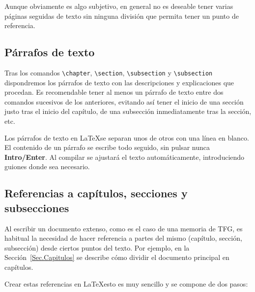 Aunque obviamente es algo subjetivo, en general no es deseable tener varias páginas seguidas de texto sin ninguna división que permita tener un punto de referencia.

\subsection{Párrafos de texto}

Tras los comandos \verb|\chapter|, \verb|\section|, \verb|\subsection| y \verb|\subsection| dispondremos los párrafos de texto con las descripciones y explicaciones que procedan. Es recomendable tener al menos un párrafo de texto entre dos comandos sucesivos de los anteriores, evitando así tener el inicio de una sección justo tras el inicio del capítulo, de una subsección inmediatamente tras la sección, etc.

Los párrafos de texto en \LaTeX se separan unos de otros con una línea en blanco. El contenido de un párrafo se escribe todo seguido, sin pulsar nunca \textbf{Intro/Enter}. Al compilar se ajustará el texto automáticamente, introduciendo guiones donde sea necesario.

\subsection{Referencias a capítulos, secciones y subsecciones}\label{Sec.Referencias}

Al escribir un documento extenso, como es el caso de una memoria de TFG, es habitual la necesidad de hacer referencia a partes del mismo (capítulo, sección, subsección) desde ciertos puntos del texto. Por ejemplo, en la Sección~\ref{Sec.Capitulos} se describe cómo dividir el documento principal en capítulos.

Crear estas referencias en \LaTeX esto es muy sencillo y se compone de dos pasos:

